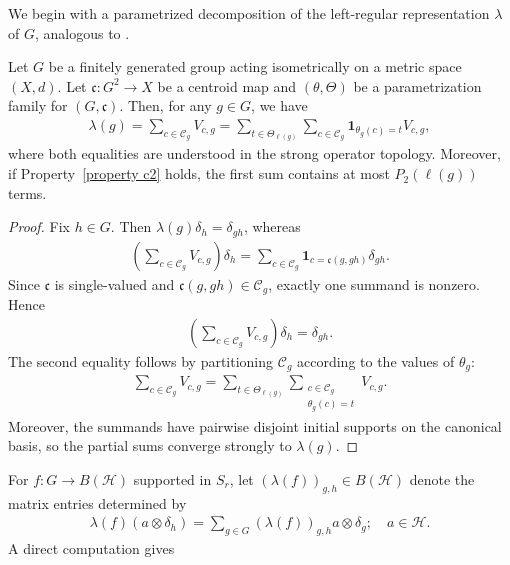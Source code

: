 \documentclass[12pt,reqno]{amsart}
\newcommand{\Hil}{\mathcal{H}}
\numberwithin{equation}{section}
\begin{document}
We begin with a parametrized decomposition of the left-regular representation $\lambda$ of $G$, analogous to \cite[Lemma 2.4]{Buchholz1999OVfree}.
\begin{proposition}\label{proposition: decomposition}
    Let $G$ be a finitely generated group acting isometrically on a metric space $(X,d)$. Let $\mathfrak{c}:G^2\to X$ be a centroid map and $(\theta,\Theta)$ be a parametrization family for $(G,\mathfrak{c})$.
    Then, for any $g\in G$, we have
    \begin{align*}
        \lambda(g)=\sum_{c\in \mathcal{C}_g}V_{c,g}=\sum_{t\in \Theta_{\ell(g)}}\sum_{c\in \mathcal{C}_g}\mathbf{1}_{\theta_g(c)=t} V_{c,g},
    \end{align*}
    where both equalities are understood in the strong operator topology.
    Moreover, if Property~\ref{property c2} holds, the first sum contains at most $P_2(\ell(g))$ terms.
\end{proposition}
\begin{proof}
    Fix $h\in G$. Then $\lambda(g)\delta_h=\delta_{gh}$, whereas
    \begin{align*}
        \left(\sum_{c\in \mathcal{C}_g}V_{c,g}\right)\delta_h=\sum_{c\in \mathcal{C}_g}\mathbf{1}_{c=\mathfrak{c}(g,gh)}\delta_{gh}.
    \end{align*}
    Since $\mathfrak{c}$ is single-valued and $\mathfrak{c}(g,gh)\in\mathcal{C}_g$, exactly one summand is nonzero. Hence
    \begin{align*}
        \left(\sum_{c\in \mathcal{C}_g}V_{c,g}\right)\delta_h=\delta_{gh}.
    \end{align*}
    The second equality follows by partitioning $\mathcal{C}_g$ according to the values of $\theta_g$:
    \begin{align*}
        \sum_{c\in \mathcal{C}_g}V_{c,g}=\sum_{t\in \Theta_{\ell(g)}}\sum_{\substack{c\in \mathcal{C}_g\\ \theta_g(c)=t}} V_{c,g}.
    \end{align*}
    Moreover, the summands have pairwise disjoint initial supports on the canonical basis, so the partial sums converge strongly to $\lambda(g)$.
\end{proof}
For $f:G\to B(\Hil)$ supported in $S_r$, let $(\lambda(f))_{g,h}\in B(\Hil)$ denote the matrix entries determined by
\begin{align*}
    \lambda(f) (a \otimes \delta_h)=\sum_{g\in G} (\lambda(f))_{g,h}a\otimes \delta_g;\quad a\in \Hil.
\end{align*}
A direct computation gives
\end{document}
